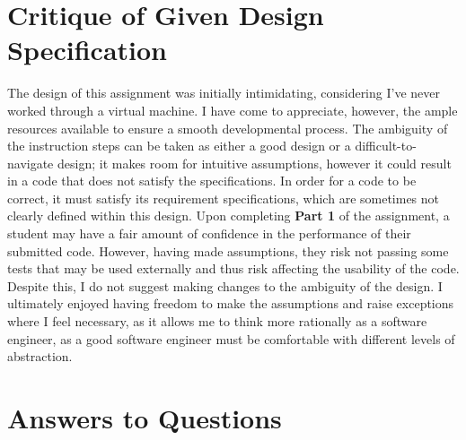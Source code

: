 \documentclass[12pt]{article}
\begin{document}
\section{Critique of Given Design Specification}

The design of this assignment was initially intimidating, considering I’ve never worked through a virtual machine. I have come to appreciate, however, the ample resources available to ensure a smooth developmental process. The ambiguity of the instruction steps can be taken as either a good design or a difficult-to-navigate design; it makes room for intuitive assumptions, however it could result in a code that does not satisfy the specifications. In order for a code to be correct, it must satisfy its requirement specifications, which are sometimes not clearly defined within this design. Upon completing \textbf{Part 1} of the assignment, a student may have a fair amount of confidence in the performance of their submitted code. However, having made assumptions, they risk not passing some tests that may be used externally and thus risk affecting the usability of the code. Despite this, I do not suggest making changes to the ambiguity of the design. I ultimately enjoyed having freedom to make the assumptions and raise exceptions where I feel necessary, as it allows me to think more rationally as a software engineer, as a good software engineer must be comfortable with different levels of abstraction. 


\section{Answers to Questions}
\end{document}
